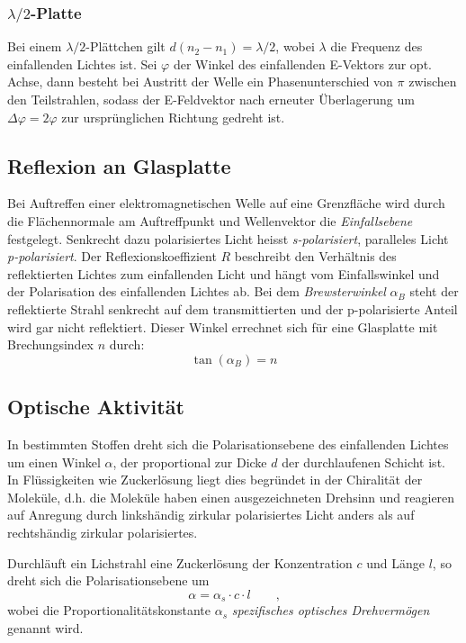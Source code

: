 \subsubsection{$\lambda/2$-Platte}
Bei einem $\lambda/2$-Plättchen gilt $d(n_2-n_1)=\lambda/2$, wobei $\lambda$ die Frequenz des einfallenden Lichtes ist. Sei $\varphi$ der Winkel des einfallenden E-Vektors zur opt. Achse, dann besteht bei Austritt der Welle ein Phasenunterschied von $\pi$ zwischen den Teilstrahlen, sodass der E-Feldvektor nach erneuter Überlagerung um $\Delta\varphi=2\varphi$ zur ursprünglichen Richtung gedreht ist.

\subsection{Reflexion an Glasplatte}
Bei Auftreffen einer elektromagnetischen Welle auf eine Grenzfläche wird durch die Flächennormale am Auftreffpunkt und Wellenvektor die \emph{Einfallsebene} festgelegt. Senkrecht dazu polarisiertes Licht heisst \emph{s-polarisiert}, paralleles Licht \emph{p-polarisiert}. Der Reflexionskoeffizient $R$ beschreibt den Verhältnis des reflektierten Lichtes zum einfallenden Licht und hängt vom Einfallswinkel und der Polarisation des einfallenden Lichtes ab. Bei dem \emph{Brewsterwinkel} $\alpha_B$ steht der reflektierte Strahl senkrecht auf dem transmittierten und der p-polarisierte Anteil wird gar nicht reflektiert. Dieser Winkel errechnet sich für eine Glasplatte mit Brechungsindex $n$ durch:
\begin{equation}
	\tan(\alpha_B)=n
	\label{eq:brewster}
\end{equation}

\subsection{Optische Aktivität}
In bestimmten Stoffen dreht sich die Polarisationsebene des einfallenden Lichtes um einen Winkel $\alpha$, der proportional zur Dicke $d$ der durchlaufenen Schicht ist. In Flüssigkeiten wie Zuckerlösung liegt dies begründet in der Chiralität der Moleküle, d.h. die Moleküle haben einen ausgezeichneten Drehsinn und reagieren auf Anregung durch linkshändig zirkular polarisiertes Licht anders als auf rechtshändig zirkular polarisiertes.

Durchläuft ein Lichstrahl eine Zuckerlösung der Konzentration $c$ und Länge $l$, so dreht sich die Polarisationsebene um
\begin{equation}
	\alpha=\alpha_s\cdot c\cdot l\qquad\text{,}
	\label{eq:zucker}
\end{equation}
wobei die Proportionalitätskonstante $\alpha_s$ \emph{spezifisches optisches Drehvermögen} genannt wird.

